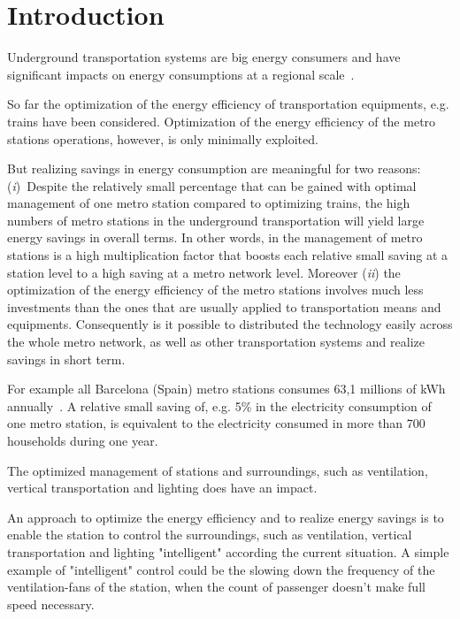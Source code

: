 \section{Introduction}
\label{sec:introduction}

Underground transportation systems are big energy consumers and have significant impacts on energy consumptions at a regional scale~\cite{anderson_maximizing_2009}. 

So far the optimization of the energy efficiency of transportation equipments, e.g. trains have been considered. Optimization of the energy efficiency of the metro stations operations, however, is only minimally exploited.

But realizing savings in energy consumption are meaningful for two reasons:
(\textit{i})~Despite the relatively small percentage that can be gained with optimal management of one metro station compared to optimizing trains, the high numbers of metro stations in the underground transportation will yield large energy savings in overall terms. In other words, in the management of metro stations is a high multiplication factor that boosts each relative small saving at a station level to a high saving at a metro network level.
Moreover (\textit{ii}) the optimization of the energy efficiency of the metro stations involves much less investments than the ones that are usually applied to transportation means and equipments. Consequently is it possible to distributed the technology easily across the whole metro network, as well as other transportation systems and realize savings in short term.

For example all Barcelona (Spain) metro stations consumes 63,1 millions of kWh annually~\cite{TMB}. A relative small saving of, e.g. 5\% in the electricity consumption of one metro station, is equivalent to the electricity consumed in more than 700 households during one year.

The optimized management of stations and surroundings, such as ventilation, vertical transportation and lighting does have an impact.

An approach to optimize the energy efficiency and to realize energy savings is to
enable the station to control the surroundings, such as ventilation, vertical transportation and lighting "intelligent" according the current situation. 
A simple example of "intelligent" control could be the slowing down the frequency of the ventilation-fans of the station, when the count of passenger doesn't make full speed necessary.


